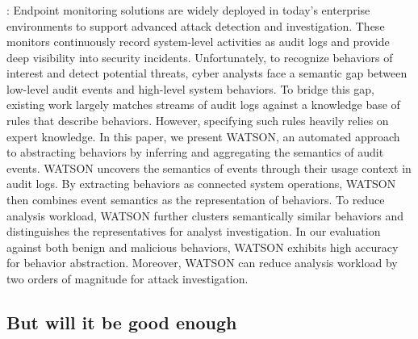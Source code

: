 \documentclass{article}
\begin{document}
\subsubsection{\textcite{Zeng:2021}}
\textbf{}:  Endpoint monitoring solutions are widely deployed in today's enterprise environments to support advanced attack detection and investigation. These monitors continuously record system-level activities as audit logs and provide deep visibility into security incidents. Unfortunately, to recognize behaviors of interest and detect potential threats, cyber analysts face a semantic gap between low-level audit events and high-level system behaviors. To bridge this gap, existing work largely matches streams of audit logs against a knowledge base of rules that describe behaviors. However, specifying such rules heavily relies on expert knowledge. In this paper, we present WATSON, an automated approach to abstracting behaviors by inferring and aggregating the semantics of audit events. WATSON uncovers the semantics of events through their usage context in audit logs. By extracting behaviors as connected system operations, WATSON then combines event semantics as the representation of behaviors. To reduce analysis workload, WATSON further clusters semantically similar behaviors and distinguishes the representatives for analyst investigation. In our evaluation against both benign and malicious behaviors, WATSON exhibits high accuracy for behavior abstraction. Moreover, WATSON can reduce analysis workload by two orders of magnitude for attack investigation.


\subsection{But will it be good enough}
\end{document}
